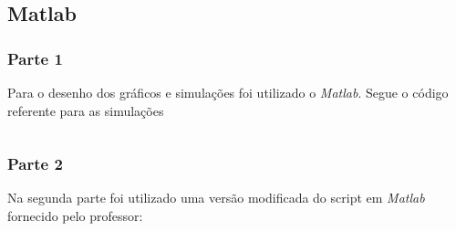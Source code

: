\documentclass[a4paper,11pt]{article}
\begin{document}
\newpage
\subsection{Matlab}

\subsubsection{Parte 1}
Para o desenho dos gráficos e simulações foi utilizado o \textit{Matlab}. Segue o código referente para as simulações

\inputminted[xleftmargin=15pt,linenos,frame=single,framesep=5pt]{matlab}{../matlab/exsim2/exsim2.m}

\subsubsection{Parte 2}
Na segunda parte foi utilizado uma versão modificada do script em \textit{Matlab} fornecido pelo professor:
\inputminted[xleftmargin=15pt,linenos,frame=single,framesep=5pt]{matlab}{../matlab/exsim2/exsim2script.m}



\end{document}
